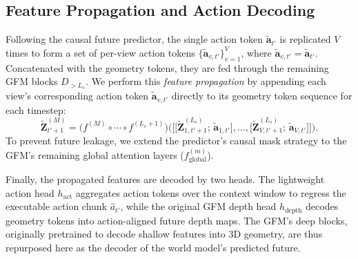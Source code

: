 \subsection{Feature Propagation and Action Decoding}
\label{sec:method:decoding}

Following the causal future predictor, the single action token $\tilde{\mathbf{a}}_{t'}$ is replicated $V$ times to form a set of per-view action tokens $\{\tilde{\mathbf{a}}_{v,t'}\}_{v=1}^{V}$, where $\tilde{\mathbf{a}}_{v,t'} = \tilde{\mathbf{a}}_{t'}$. Concatenated with the geometry tokens, they are fed through the remaining GFM blocks $D_{> L_s}$. We perform this \emph{feature propagation} by appending each view's corresponding action token $\tilde{\mathbf{a}}_{v,t'}$ directly to its geometry token sequence for each timestep:
\begin{equation}
    \tilde{\mathbf{Z}}_{t'+1}^{(M)} = \big(f^{(M)} \circ \cdots \circ f^{(L_s+1)}\big)\!\Big(\Big[\big[\tilde{\mathbf{Z}}_{1,t'+1}^{(L_s)};\, \tilde{\mathbf{a}}_{1,t'}\big], \ldots, \big[\tilde{\mathbf{Z}}_{V,t'+1}^{(L_s)};\, \tilde{\mathbf{a}}_{V,t'}\big]\Big]\Big).
\end{equation}
To prevent future leakage, we extend the predictor's causal mask strategy to the GFM's remaining global attention layers ($f_{\text{global}}^{(m)}$).

Finally, the propagated features are decoded by two heads. The lightweight action head $h_{\text{act}}$ aggregates action tokens over the context window to regress the executable action chunk $\hat a_{t'}$, while the original GFM depth head $h_{\text{depth}}$ decodes geometry tokens into action-aligned future depth maps. The GFM's deep blocks, originally pretrained to decode shallow features into 3D geometry, are thus repurposed here as the decoder of the world model's predicted future.

